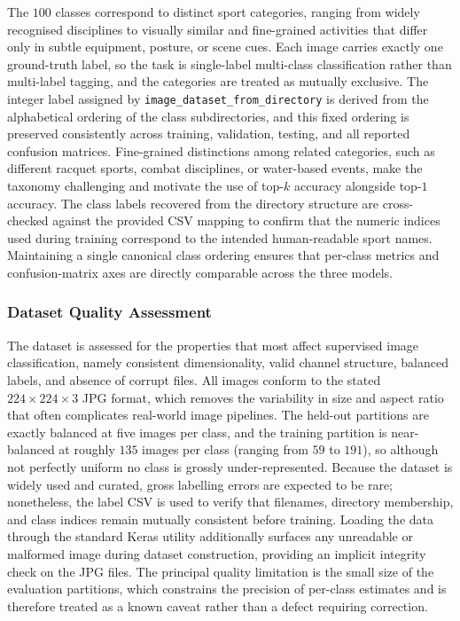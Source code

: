 The $100$ classes correspond to distinct sport categories, ranging from widely recognised disciplines to visually similar and fine-grained activities that differ only in subtle equipment, posture, or scene cues.
Each image carries exactly one ground-truth label, so the task is single-label multi-class classification rather than multi-label tagging, and the categories are treated as mutually exclusive.
The integer label assigned by \texttt{image\_dataset\_from\_directory} is derived from the alphabetical ordering of the class subdirectories, and this fixed ordering is preserved consistently across training, validation, testing, and all reported confusion matrices.
Fine-grained distinctions among related categories, such as different racquet sports, combat disciplines, or water-based events, make the taxonomy challenging and motivate the use of top-$k$ accuracy alongside top-$1$ accuracy.
The class labels recovered from the directory structure are cross-checked against the provided CSV mapping to confirm that the numeric indices used during training correspond to the intended human-readable sport names.
Maintaining a single canonical class ordering ensures that per-class metrics and confusion-matrix axes are directly comparable across the three models.

\subsubsection{Dataset Quality Assessment}
\label{subsubsec:method-quality}

The dataset is assessed for the properties that most affect supervised image classification, namely consistent dimensionality, valid channel structure, balanced labels, and absence of corrupt files.
All images conform to the stated $224\times224\times3$ JPG format, which removes the variability in size and aspect ratio that often complicates real-world image pipelines.
The held-out partitions are exactly balanced at five images per class, and the training partition is near-balanced at roughly $135$ images per class (ranging from $59$ to $191$), so although not perfectly uniform no class is grossly under-represented.
Because the dataset is widely used and curated, gross labelling errors are expected to be rare; nonetheless, the label CSV is used to verify that filenames, directory membership, and class indices remain mutually consistent before training.
Loading the data through the standard Keras utility additionally surfaces any unreadable or malformed image during dataset construction, providing an implicit integrity check on the JPG files.
The principal quality limitation is the small size of the evaluation partitions, which constrains the precision of per-class estimates and is therefore treated as a known caveat rather than a defect requiring correction.


